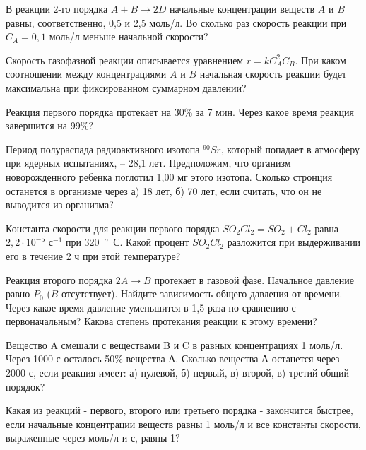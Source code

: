 \begin{Task}
В реакции 2-го порядка $A + B\rightarrow 2D$ начальные концентрации веществ $A$ и $B$ равны, соответственно, 0,5 и 2,5 моль/л. Во сколько раз скорость реакции при $C_{A}= 0,1$ моль/л меньше начальной скорости?  
\end{Task}
\begin{Task}
Скорость газофазной реакции описывается уравнением 
$r = kC_{A}^{2}C_{B}$.
При каком соотношении между концентрациями $A$ и $B$ начальная скорость реакции будет максимальна при фиксированном суммарном давлении?  
\end{Task}
\begin{Task}
Реакция первого порядка протекает на 30\% за 7 мин. Через какое время реакция завершится на 99\%?
\end{Task}
\begin{Task}
Период полураспада радиоактивного изотопа $^{90}Sr$, который попадает в атмосферу при ядерных испытаниях, -- 28,1 лет. Предположим, что организм новорожденного ребенка поглотил 1,00 мг этого изотопа. Сколько стронция останется в организме через а) 18 лет, б) 70 лет, если считать, что он не выводится из организма? 
\end{Task}
\begin{Task}
Константа скорости для реакции первого порядка 
$SO_{2}Cl_{2} = SO_{2} + Cl_{2}$
 равна $2,2\cdot 10^{-5}$ с$^{-1}$ при 320~$^{o}$~С. Какой процент $SO_{2}Cl_{2}$ разложится при выдерживании его в течение 2 ч при этой температуре?
\end{Task}
\begin{Task}
Реакция второго порядка $2A\rightarrow B$ протекает в газовой фазе. Начальное давление равно $P_{0}$ ($B$ отсутствует). Найдите зависимость общего давления от времени. Через какое время давление уменьшится в 1,5 раза по сравнению с первоначальным? Какова степень протекания реакции к этому времени?  
\end{Task}
\begin{Task}
Вещество A смешали с веществами B и C в равных концентрациях 1 моль/л. Через 1000 с осталось 50\% вещества А. Сколько вещества А останется через 2000 с, если реакция имеет: а) нулевой, б) первый, в) второй, в) третий общий порядок?
\end{Task}
\begin{Task}
Какая из реакций - первого, второго или третьего порядка - закончится быстрее, если начальные концентрации веществ равны 1 моль/л и все константы скорости, выраженные через моль/л и с, равны 1?
\end{Task}
